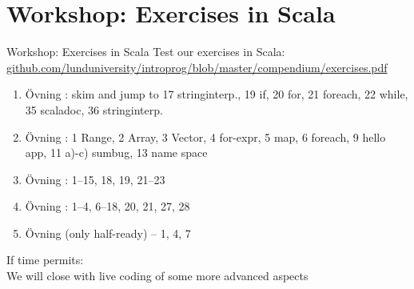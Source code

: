 \documentclass{lecturenotes}
\begin{document}
\section[Workshop]{Workshop: Exercises in Scala}

\begin{Slide}{Workshop: Exercises in Scala}
Test our  exercises in Scala:  \\ 
\href{https://github.com/lunduniversity/introprog/blob/master/compendium/exercises.pdf}{\footnotesize github.com/lunduniversity/introprog/blob/master/compendium/exercises.pdf}
 \\ 
\begin{enumerate}\fontsize{8}{10}\selectfont
\item Övning :  skim and jump to 17 stringinterp., 19 if, 20 for, 21 foreach, 22 while, 35 scaladoc, 36 stringinterp.
\item Övning : 1 Range, 2 Array, 3 Vector, 4 for-expr, 5 map, 6 foreach, 9 hello app, 11 a)-c) sumbug, 13 name space
\item Övning : 1--15, 18, 19, 21--23 
\item Övning : 1--4, 6--18, 20,  21, 27, 28
\item Övning  (only half-ready) -- 1, 4, 7  
\end{enumerate}

If time permits: \\ We will close with live coding of some more advanced aspects

\end{Slide}
\end{document}

